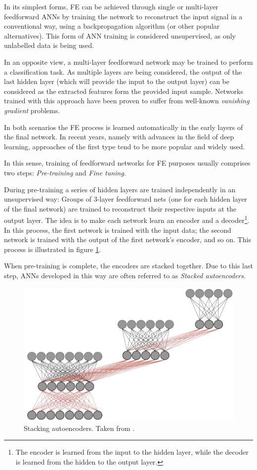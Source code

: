 \documentclass[9pt,journal,compsoc]{IEEEtran}
\begin{document}
In its simplest forms, FE can be achieved through single or multi-layer feedforward ANNs by training the network to reconstruct the input signal in a conventional way, using a backpropagation algorithm (or other popular alternatives). This form of ANN training is considered unsupervised, as only unlabelled data is being used.

In an opposite view, a multi-layer feedforward network may be trained to perform a classification task. As multiple layers are being considered, the output of the last hidden layer (which will provide the input to the output layer) can be considered as the extracted features form the provided input sample. Networks trained with this approach have been proven to suffer from well-known \emph{vanishing gradient} problems\cite{nielsen2015neural}.

In both scenarios the FE process is learned automatically in the early layers of the final network. In recent years, namely with advances in the field of deep learning, approaches of the first type tend to be more popular and widely used.

In this sense, training of feedforward networks for FE purposes usually comprises two steps: \emph{Pre-training} and \emph{Fine tuning}.

During pre-training a series of hidden layers are trained independently in an unsupervised way: Groups of 3-layer feedforward nets (one for each hidden layer of the final network) are trained to reconstruct their respective inputs at the output layer. The idea is to make each network learn an encoder and a decoder\footnote{The encoder is learned from the input to the hidden layer, while the decoder is learned from the hidden to the output layer.}. In this process, the first network is trained with the input data; the second network is trained with the output of the first network's encoder, and so on. This process is illustrated in figure \ref{barata_saes}.

When pre-training is complete, the encoders are stacked together. Due to this last step, ANNs developed in this way are often referred to as \emph{Stacked autoencoders}.

\begin{figure}[ht]
	\centering
	\includegraphics[scale=0.2]{stacked_autoencoders.png}
	\caption{Stacking autoencoders. Taken from \cite{barata_saes_presentation}.}
	\label{barata_saes}
\end{figure}
\end{document}
